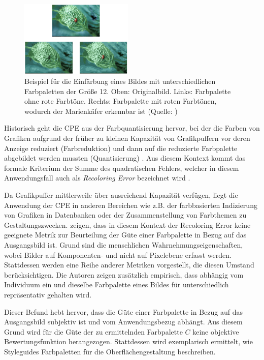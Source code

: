\documentclass[10pt,a4paper,bibliography=totoc,twocolumn]{scrartcl}
\begin{document}
\begin{figure}
\centering
\includegraphics[width=0.48\textwidth]{img/ladybug.png}
\caption{Beispiel für die Einfärbung eines Bildes mit unterschiedlichen Farbpaletten der Größe 12. Oben: Originalbild. Links: Farbpalette ohne rote Farbtöne. Rechts: Farbpalette mit roten Farbtönen, wodurch der Marienkäfer erkennbar ist (Quelle: \citep{acopa})}
\label{fig:ladybug}
\end{figure}


Historisch geht die CPE aus der Farbquantisierung hervor, bei der die Farben von Grafiken aufgrund der früher zu kleinen Kapazität von Grafikpuffern vor deren Anzeige reduziert (Farbreduktion) und dann auf die reduzierte Farbpalette abgebildet werden mussten (Quantisierung) \citep{variance}. Aus diesem Kontext kommt das formale Kriterium der Summe des quadratischen Fehlers, welcher in diesem Anwendungsfall auch als \emph{Recoloring Error} bezeichnet wird \citep{colorthemes}.

Da Grafikpuffer mittlerweile über ausreichend Kapazität verfügen, liegt die Anwendung der CPE in anderen Bereichen wie z.B. der farbbasierten Indizierung von Grafiken in Datenbanken oder der Zusammenstellung von Farbthemen zu Gestaltungszwecken. \citet{colorthemes} zeigen, dass in diesem Kontext der Recoloring Error keine geeignete Metrik zur Beurteilung der Güte einer Farbpalette in Bezug auf das Ausgangsbild ist. Grund sind die menschlichen Wahrnehmungseigenschaften, wobei Bilder auf Komponenten- und nicht auf Pixelebene erfasst werden. Stattdessen werden eine Reihe anderer Metriken vorgestellt, die diesen Umstand berücksichtigen. Die Autoren zeigen zusätzlich empirisch, dass abhängig vom Individuum ein und dieselbe Farbpalette eines Bildes für unterschiedlich repräsentativ gehalten wird. 

Dieser Befund hebt hervor, dass die Güte einer Farbpalette in Bezug auf das Ausgangsbild subjektiv ist und vom Anwendungsbezug abhängt. Aus diesem Grund wird für die Güte der zu ermittelnden Farbpalette $C$ keine objektive Bewertungsfunktion herangezogen. Stattdessen wird exemplarisch ermittelt, wie Styleguides Farbpaletten für die Oberflächengestaltung beschreiben.
\end{document}
